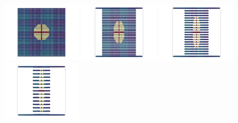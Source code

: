 \begin{center}
\includegraphics[width=4cm]{python_codes/fieldstone_89/results/biaxial/paint0000}
\includegraphics[width=4cm]{python_codes/fieldstone_89/results/biaxial/paint0005}
\includegraphics[width=4cm]{python_codes/fieldstone_89/results/biaxial/paint0010}
\includegraphics[width=4cm]{python_codes/fieldstone_89/results/biaxial/paint0015}
\end{center}

